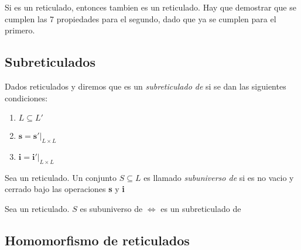 \begin{remark}
  Si \reticulAlg es un reticulado, entonces  tambien es un reticulado. Hay que demostrar que 
  se cumplen las 7 propiedades para el segundo, dado que ya se cumplen para el primero.
\end{remark}

\subsection{Subreticulados}

\begin{definition}
  Dados reticulados \reticulAlg y  diremos que \reticulAlg
  es un \emph{subreticulado de}  si se dan las siguientes condiciones:
  \begin{enumerate}
    \item $L \subseteq L'$
    \item $\textbf{s} = \textbf{s}'\vert_{L\times L}$
    \item $\textbf{i} = \textbf{i}'\vert_{L\times L}$
  \end{enumerate}
\end{definition}
\begin{definition}
  Sea \reticulAlg un reticulado. Un conjunto $S \subseteq L$ es llamado \emph{subuniverso de} \reticulAlg
  si es no vacio y cerrado bajo las operaciones \textbf{s} y \textbf{i}
\end{definition}
\begin{remark}
  Sea \reticulAlg un reticulado. $S$ es subuniverso de \reticulAlg $\iff$ 
  es un subreticulado de \reticulAlg
\end{remark}

\subsection{Homomorfismo de reticulados}

